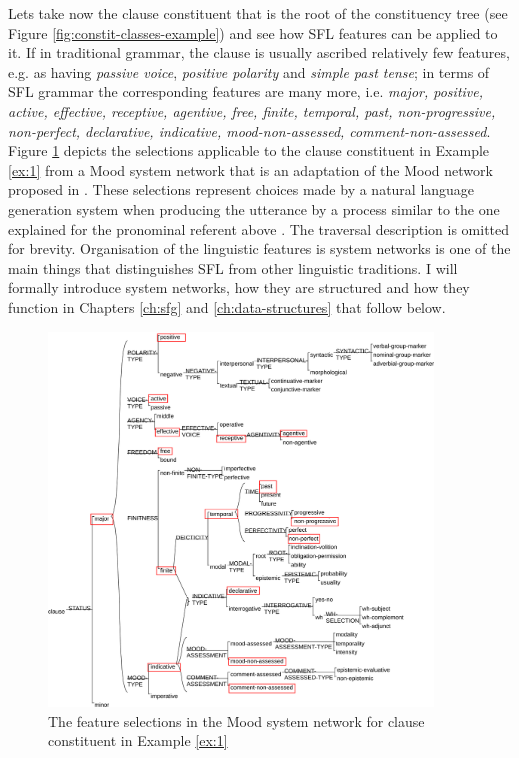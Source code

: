 Lets take now the clause constituent that is the root of the constituency tree (see Figure \ref{fig:constit-classes-example}) and see how SFL features can be applied to it. If in traditional grammar, the clause is usually ascribed relatively few features, e.g. as having \textit{passive voice}, \textit{positive polarity} and \textit{simple past tense}; in terms of SFL grammar the corresponding features are many more, i.e. \textit{major, positive, active, effective, receptive, agentive, free, finite, temporal, past, non-progressive, non-perfect, declarative, indicative, mood-non-assessed, comment-non-assessed}. Figure \ref{fig:mood-selections} depicts the selections applicable to the clause constituent in Example \ref{ex:1} from a Mood system network that is an adaptation of the Mood network proposed in \citet[162]{Halliday2013}. These selections represent choices made by a natural language generation system when producing the utterance by a process similar to the one explained for the pronominal referent above \citep{MatthiessenBateman91}. The traversal description is omitted for brevity. Organisation of the linguistic features is system networks is one of the main things that distinguishes SFL from other linguistic traditions. I will formally introduce system networks, how they are structured and how they function in Chapters \ref{ch:sfg} and \ref{ch:data-structures} that follow below. 

\begin{figure}[!ht]
    \centering      
    \includegraphics[width=0.91\textwidth]{Figures/Example/mood-selections.pdf}      
    \caption{The feature selections in the Mood system network for clause constituent in Example \ref{ex:1}}
    \label{fig:mood-selections}
\end{figure}

